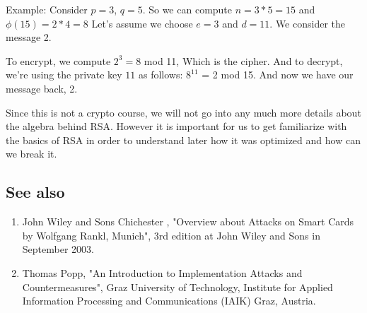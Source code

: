 Example: Consider $p = 3$, $q = 5$. So we can compute $n = 3*5 = 15$ and $\phi(15) = 2 * 4 = 8$
Let's assume we choose $e = 3$ and $d=11$. We consider the message 2.

To encrypt, we compute $2^{3} = 8$ mod 11, Which is the cipher. And to decrypt, we're using the private key $11$ as follows: $8^{11}$ = 2 mod 15.
And now we have our message back, 2.

Since this is not a crypto course, we will not go into any much more details about the algebra behind RSA.
However it is important for us to get familiarize with the basics of RSA in order to understand later
how it was optimized and how can we break it.

\subsection{See also}
\begin{enumerate}
    \item John Wiley and Sons Chichester , "Overview about Attacks on Smart Cards by Wolfgang Rankl, Munich", 3rd edition at John Wiley and Sons in September 2003.
    \item Thomas Popp, "An Introduction to Implementation Attacks and Countermeasures", Graz University of Technology, Institute for Applied Information Processing and Communications (IAIK) Graz, Austria.
\end{enumerate}